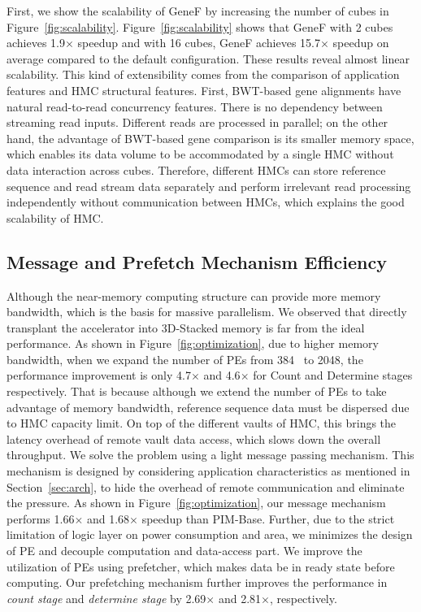 \documentclass[9pt,conference]{IEEEtran}
\begin{document}
First, we show the scalability of GeneF by increasing the number of cubes in Figure~\ref{fig:scalability}. Figure~\ref{fig:scalability} shows that GeneF with 2 cubes achieves 1.9$\times$ speedup and with 16 cubes, GeneF achieves 15.7$\times$ speedup on average compared to the default configuration. These results reveal almost linear scalability. This kind of extensibility comes from the comparison of application features and HMC structural features. First, BWT-based gene alignments have natural read-to-read concurrency features. There is no dependency between streaming read inputs. Different reads are processed in parallel; on the other hand, the advantage of BWT-based gene comparison is its smaller memory space, which enables its data volume to be accommodated by a single HMC without data interaction across cubes. Therefore, different HMCs can store reference sequence and read stream data separately and perform irrelevant read processing independently without communication between HMCs, which explains the good scalability of HMC.

\subsection{Message and Prefetch Mechanism Efficiency}
Although the near-memory computing structure can provide more memory bandwidth, which is the basis for massive parallelism. We observed that directly transplant the accelerator into 3D-Stacked memory is far from the ideal performance. As shown in Figure~\ref{fig:optimization}, due to higher memory bandwidth, when we expand the number of PEs from 384~\cite{yuanrong} to 2048, the performance improvement is only 4.7$\times$ and 4.6$\times$ for Count and Determine stages respectively. That is because although we extend the number of PEs to take advantage of memory bandwidth, reference sequence data must be dispersed due to HMC capacity limit. On top of the different vaults of HMC, this brings the latency overhead of remote vault data access, which slows down the overall throughput. We solve the problem using a light message passing mechanism. This mechanism is designed by considering application characteristics as mentioned in Section~\ref{sec:arch}, to hide the overhead of remote communication and eliminate the pressure. As shown in Figure~\ref{fig:optimization}, our message mechanism performs 1.66$\times$ and 1.68$\times$ speedup than PIM-Base. Further, due to the strict limitation of logic layer on power consumption and area, we minimizes the design of PE and decouple computation and data-access part. We improve the utilization of PEs using prefetcher, which makes data be in ready state before computing. Our prefetching mechanism further improves the performance in \textit{count stage} and \textit{determine stage} by 2.69$\times$ and 2.81$\times$, respectively.
\end{document}
